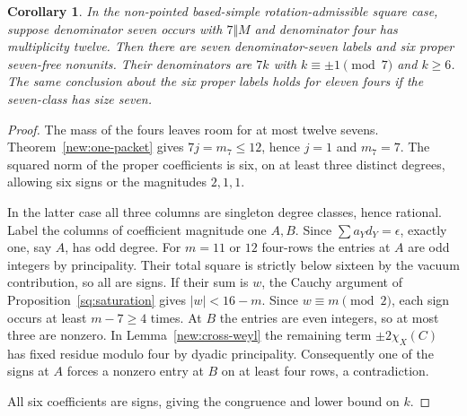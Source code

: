 \documentclass[11pt]{amsart}
\numberwithin{equation}{section}
\newtheorem{corollary}[theorem]{Corollary}
\theoremstyle{definition}
\theoremstyle{plain}
\begin{document}
\begin{corollary}\label{new:seven-shape}
In the non-pointed based-simple rotation-admissible square case, suppose denominator seven occurs with $7\Vert M$ and denominator four has multiplicity twelve. Then there are seven denominator-seven labels and six proper seven-free nonunits. Their denominators are $7k$ with $k\equiv\pm1\pmod7$ and $k\ge6$.
The same conclusion about the six proper labels holds for eleven fours
if the seven-class has size seven.
\end{corollary}
\begin{proof}
The mass of the fours leaves room for at most twelve sevens. Theorem~\ref{new:one-packet} gives $7j=m_7\le12$, hence $j=1$ and $m_7=7$. The squared norm of the proper coefficients is six, on at least three distinct degrees, allowing six signs or the magnitudes $2,1,1$.

In the latter case all three columns are singleton degree classes, hence rational. Label the columns of coefficient magnitude one $A,B$. Since $\sum a_Yd_Y=\epsilon$, exactly one, say $A$, has odd degree. For $m=11$ or $12$ four-rows the entries at $A$ are odd integers by
principality. Their total square is strictly below sixteen by the
vacuum contribution, so all are signs. If their sum is $w$, the
Cauchy argument of Proposition~\ref{sq:saturation} gives
$|w|<16-m$. Since $w\equiv m\pmod2$, each sign occurs at least
$m-7\ge4$ times. At $B$ the entries are even integers, so at most
three are nonzero. In Lemma~\ref{new:cross-weyl} the remaining term
$\pm2\chi_X(C)$ has fixed residue modulo four by dyadic principality.
Consequently one of the signs at $A$ forces a nonzero entry at $B$
on at least four rows, a contradiction.

All six coefficients are signs, giving the congruence and lower bound on $k$.
\end{proof}
\end{document}
